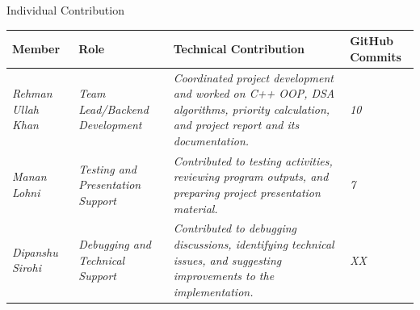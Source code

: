 \documentclass[aspectratio=169,11pt]{beamer}
\newcommand{\placeholder}[1]{%
\textit{\color{GEUGrey}#1}
}
\begin{document}
\begin{frame}{Individual Contribution}

\scriptsize

\begin{center}

\renewcommand{\arraystretch}{1.35}

\begin{tabularx}{.96\textwidth}
{@{}p{2.0cm}p{2.0cm}X p{1.6cm}@{}}

\toprule
Member &
Role &
Technical Contribution &
GitHub Commits\\
\midrule

\placeholder{Rehman Ullah Khan} &
\placeholder{Team Lead/Backend Development} &
\placeholder{Coordinated project development and worked on C++ OOP, DSA algorithms, priority calculation, and project report and its documentation.} &
\placeholder{10}\\

\placeholder{Manan Lohni} &
\placeholder{Testing and Presentation Support} &
\placeholder{Contributed to testing activities, reviewing program outputs, and preparing project presentation material.} &
\placeholder{7}\\

\placeholder{Dipanshu Sirohi} &
\placeholder{Debugging and Technical Support} &
\placeholder{Contributed to debugging discussions, identifying technical issues, and suggesting improvements to the implementation.} &
\placeholder{XX}\\



\bottomrule

\end{tabularx}

\end{center}

\vspace{3mm}



\end{frame}
\end{document}
